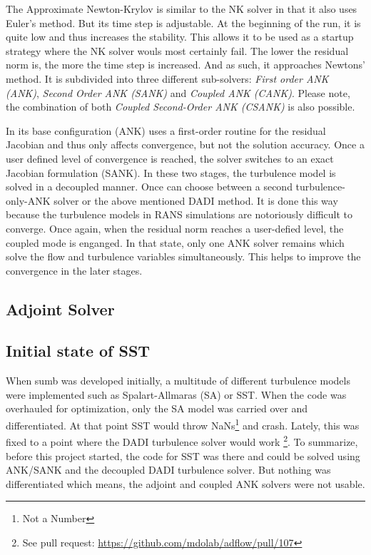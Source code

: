 The Approximate Newton-Krylov is similar to the NK solver in that it also uses
Euler's method. But its time step is adjustable. At the beginning of the run,
it is quite low and thus increases the stability. This allows it to be used
as a startup strategy where the NK solver wouls most certainly fail. The
lower the residual norm is, the more the time step is increased. And as such, it
approaches Newtons' method. It is subdivided into three different sub-solvers:
\textit{First order ANK (ANK)}, \textit{Second Order ANK (SANK)} and
\textit{Coupled ANK (CANK)}. Please note, the combination of both
\textit{Coupled Second-Order ANK (CSANK)} is also possible.

In its base configuration (ANK) uses a first-order routine for the residual
Jacobian and thus only affects convergence, but not the solution accuracy. Once a user defined level of
convergence is reached, the solver switches to an exact Jacobian formulation
(SANK). In these two stages, the turbulence model is solved in a decoupled
manner. Once can choose between a second turbulence-only-ANK solver or the
above mentioned DADI method. It is done this way because the turbulence models
in RANS simulations are notoriously difficult to converge. Once again, when the
residual norm reaches a user-defied level, the coupled mode is enganged. In
that state, only one ANK solver remains which solve the flow and turbulence
variables simultaneously. This helps to improve the convergence in the later
stages. \cite{adflow_solvers}




\subsection{Adjoint Solver}




\subsection{Initial state of SST}
When sumb was developed initially, a multitude of different turbulence models
were implemented such as Spalart-Allmaras (SA) or SST. When the code was
overhauled for optimization, only the SA model was carried over and
differentiated. At that point SST would throw NaNs\footnote{Not a Number} and
crash. Lately, this was fixed to a point where the DADI turbulence solver would
work \footnote{See pull request:
\url{https://github.com/mdolab/adflow/pull/107}}. To summarize, before this
project started, the code for SST was there and could be solved using ANK/SANK
and the decoupled DADI turbulence solver. But nothing was differentiated which
means, the adjoint and coupled ANK solvers were not usable.







